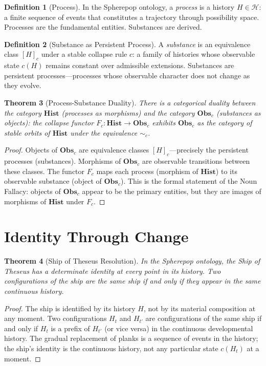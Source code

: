 \documentclass[12pt, a4paper, openany]{book}
\theoremstyle{plain}
\newtheorem{theorem}{Theorem}[chapter]
\theoremstyle{definition}
\newtheorem{definition}[theorem]{Definition}
\theoremstyle{remark}
\newcommand{\Hist}{\mathbf{Hist}}
\newcommand{\Obs}{\mathbf{Obs}}
\newcommand{\calH}{\mathcal{H}}
\begin{document}
\begin{definition}[Process]
In the Spherepop ontology, a \emph{process} is a history $H \in \calH$:
a finite sequence of events that constitutes a trajectory through possibility
space. Processes are the fundamental entities. Substances are derived.
\end{definition}

\begin{definition}[Substance as Persistent Process]
A \emph{substance} is an equivalence class $[H]_c$ under a stable collapse
rule $c$: a family of histories whose observable state $c(H)$ remains constant
over admissible extensions. Substances are persistent processes---processes
whose observable character does not change as they evolve.
\end{definition}

\begin{theorem}[Process-Substance Duality]
There is a categorical duality between the category $\Hist$ (processes as
morphisms) and the category $\Obs_c$ (substances as objects): the collapse
functor $F_c : \Hist \to \Obs_c$ exhibits $\Obs_c$ as the category of
stable orbits of $\Hist$ under the equivalence $\sim_c$.
\end{theorem}

\begin{proof}
Objects of $\Obs_c$ are equivalence classes $[H]_c$---precisely the persistent
processes (substances). Morphisms of $\Obs_c$ are observable transitions between
these classes. The functor $F_c$ maps each process (morphism of $\Hist$) to its
observable substance (object of $\Obs_c$). This is the formal statement of the
Noun Fallacy: objects of $\Obs_c$ appear to be the primary entities, but they
are images of morphisms of $\Hist$ under $F_c$.
\end{proof}

\section{Identity Through Change}

\begin{theorem}[Ship of Theseus Resolution]
In the Spherepop ontology, the Ship of Theseus has a determinate identity at
every point in its history. Two configurations of the ship are the same ship
if and only if they appear in the same continuous history.
\end{theorem}

\begin{proof}
The ship is identified by its history $H$, not by its material composition
at any moment. Two configurations $H_t$ and $H_{t'}$ are configurations of
the same ship if and only if $H_t$ is a prefix of $H_{t'}$ (or vice versa)
in the continuous developmental history. The gradual replacement of planks
is a sequence of events in the history; the ship's identity is the continuous
history, not any particular state $c(H_t)$ at a moment.
\end{proof}
\end{document}
